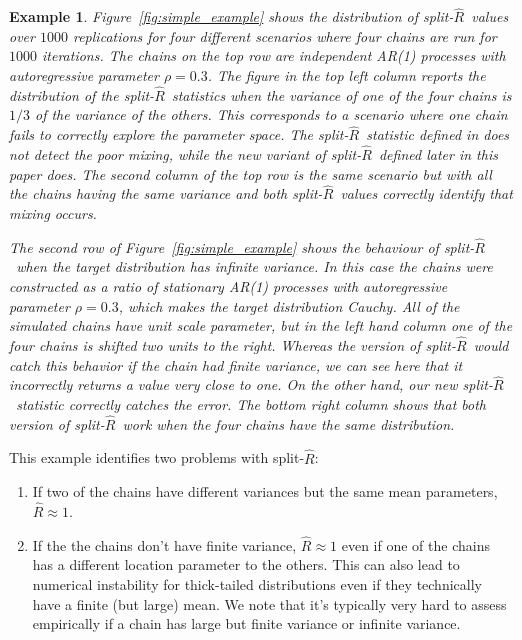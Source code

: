 \documentclass[american,]{article}
\newcommand{\sRhat}{split-$\widehat{R}$}
\newtheorem{example}{Example}
\begin{document}
\begin{example}

Figure~\ref{fig:simple_example} shows the distribution of \sRhat\  values over $1000$ replications for four different scenarios where four chains are run for $1000$ iterations. The chains on the top row are independent AR(1) processes with autoregressive parameter $\rho=0.3$. The figure in the top left column reports the distribution of the \sRhat\ statistics  when the variance of one of the four chains is $1/3$ of the variance of the others. This corresponds to a scenario where one chain fails to correctly explore the parameter space. The \sRhat\ statistic defined in \citet{BDA3}  does not detect the poor mixing, while the new variant of \sRhat\ defined later in this paper does. The second column of the top row is the same scenario but with all the chains having the same variance and both \sRhat\ values correctly identify that mixing occurs.

The second row of Figure~\ref{fig:simple_example} shows the behaviour of \sRhat\ when the target distribution has infinite variance. In this case the chains were constructed as a ratio of stationary AR(1) processes with autoregressive parameter  $\rho=0.3$, which makes the target distribution Cauchy.  All of the simulated chains have  unit scale parameter, but in the left hand column one of the four chains is shifted two  units to the right.  Whereas the \citet{BDA3} version of \sRhat\ would catch this behavior if the chain had finite variance, we can see here that it incorrectly returns a value very close to one. On the other hand, our new \sRhat\ statistic correctly catches the error. The bottom right column shows that both version of \sRhat\ work when the four chains have the same distribution. 
\end{example}

This example identifies two problems with \sRhat : 
\begin{enumerate}
\item If two of the chains have different variances but the same mean parameters, $\widehat{R} \approx 1$.
\item If the the chains don't have finite variance, $\widehat{R} \approx 1$ even if one of the chains has a different location parameter to the others. This can also lead to numerical instability for thick-tailed distributions even if they technically have a finite (but large) mean. We note that it's typically very hard to assess empirically
if a chain has large but finite variance or infinite variance.
\end{enumerate}
\end{document}
